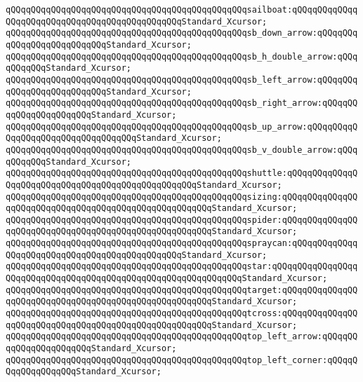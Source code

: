 \verb|qQQqqQQqqQQqqQQqqQQqqQQqqQQqqQQqqQQqqQQqqQQqqQQqsailboat:qQQqqQQqqQQqqQQqqQQqqQQqqQQqqQQqqQQqqQQqqQQqqQQqStandard_Xcursor;|\newline
\verb|qQQqqQQqqQQqqQQqqQQqqQQqqQQqqQQqqQQqqQQqqQQqqQQqsb_down_arrow:qQQqqQQqqQQqqQQqqQQqqQQqqQQqStandard_Xcursor;|\newline
\verb|qQQqqQQqqQQqqQQqqQQqqQQqqQQqqQQqqQQqqQQqqQQqqQQqsb_h_double_arrow:qQQqqQQqqQQqStandard_Xcursor;|\newline
\verb|qQQqqQQqqQQqqQQqqQQqqQQqqQQqqQQqqQQqqQQqqQQqqQQqsb_left_arrow:qQQqqQQqqQQqqQQqqQQqqQQqqQQqStandard_Xcursor;|\newline
\verb|qQQqqQQqqQQqqQQqqQQqqQQqqQQqqQQqqQQqqQQqqQQqqQQqsb_right_arrow:qQQqqQQqqQQqqQQqqQQqqQQqStandard_Xcursor;|\newline
\verb|qQQqqQQqqQQqqQQqqQQqqQQqqQQqqQQqqQQqqQQqqQQqqQQqsb_up_arrow:qQQqqQQqqQQqqQQqqQQqqQQqqQQqqQQqqQQqStandard_Xcursor;|\newline
\verb|qQQqqQQqqQQqqQQqqQQqqQQqqQQqqQQqqQQqqQQqqQQqqQQqsb_v_double_arrow:qQQqqQQqqQQqStandard_Xcursor;|\newline
\verb|qQQqqQQqqQQqqQQqqQQqqQQqqQQqqQQqqQQqqQQqqQQqqQQqshuttle:qQQqqQQqqQQqqQQqqQQqqQQqqQQqqQQqqQQqqQQqqQQqqQQqqQQqStandard_Xcursor;|\newline
\verb|qQQqqQQqqQQqqQQqqQQqqQQqqQQqqQQqqQQqqQQqqQQqqQQqsizing:qQQqqQQqqQQqqQQqqQQqqQQqqQQqqQQqqQQqqQQqqQQqqQQqqQQqqQQqStandard_Xcursor;|\newline
\verb|qQQqqQQqqQQqqQQqqQQqqQQqqQQqqQQqqQQqqQQqqQQqqQQqspider:qQQqqQQqqQQqqQQqqQQqqQQqqQQqqQQqqQQqqQQqqQQqqQQqqQQqqQQqStandard_Xcursor;|\newline
\verb|qQQqqQQqqQQqqQQqqQQqqQQqqQQqqQQqqQQqqQQqqQQqqQQqspraycan:qQQqqQQqqQQqqQQqqQQqqQQqqQQqqQQqqQQqqQQqqQQqqQQqStandard_Xcursor;|\newline
\verb|qQQqqQQqqQQqqQQqqQQqqQQqqQQqqQQqqQQqqQQqqQQqqQQqstar:qQQqqQQqqQQqqQQqqQQqqQQqqQQqqQQqqQQqqQQqqQQqqQQqqQQqqQQqqQQqqQQqStandard_Xcursor;|\newline
\verb|qQQqqQQqqQQqqQQqqQQqqQQqqQQqqQQqqQQqqQQqqQQqqQQqtarget:qQQqqQQqqQQqqQQqqQQqqQQqqQQqqQQqqQQqqQQqqQQqqQQqqQQqqQQqStandard_Xcursor;|\newline
\verb|qQQqqQQqqQQqqQQqqQQqqQQqqQQqqQQqqQQqqQQqqQQqqQQqtcross:qQQqqQQqqQQqqQQqqQQqqQQqqQQqqQQqqQQqqQQqqQQqqQQqqQQqqQQqStandard_Xcursor;|\newline
\verb|qQQqqQQqqQQqqQQqqQQqqQQqqQQqqQQqqQQqqQQqqQQqqQQqtop_left_arrow:qQQqqQQqqQQqqQQqqQQqqQQqStandard_Xcursor;|\newline
\verb|qQQqqQQqqQQqqQQqqQQqqQQqqQQqqQQqqQQqqQQqqQQqqQQqtop_left_corner:qQQqqQQqqQQqqQQqqQQqStandard_Xcursor;|\newline
